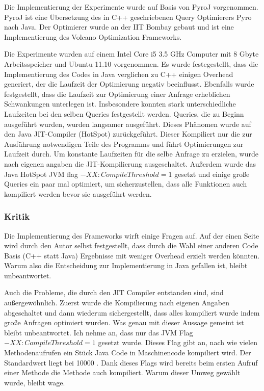 Die Implementierung der Experimente wurde auf Basis von PyroJ vorgenommen. PyroJ ist eine Übersetzung des in C++ geschriebenen Query Optimierers Pyro nach Java. Der Optimierer wurde an der IIT Bombay gebaut und ist eine Implementierung des Volcano Optimization Frameworks.

Die Experimente wurden auf einem Intel Core i5 3.5 GHz Computer mit 8 Gbyte Arbeitsspeicher und Ubuntu 11.10 vorgenommen. Es wurde festegestellt, dass die Implementierung des Codes in Java verglichen zu C++ einigen Overhead generiert, der die Laufzeit der Optimierung negativ beeinflusst. Ebenfalls wurde festgestellt, dass die Laufzeit zur Optimierung einer Anfrage erheblichen Schwankungen unterlegen ist. Insbesondere konnten stark unterschiedliche Laufzeiten bei den selben Queries festgestellt werden. Queries, die zu Beginn ausgeführt wurden, wurden langsamer ausgeführt. Dieses Phänomen wurde auf den Java JIT-Compiler (HotSpot) zurückgeführt. Dieser Kompiliert nur die zur Ausführung notwendigen Teile des Programms und führt Optimierungen zur Laufzeit durch. Um konstante Laufzeiten für die selbe Anfrage zu erzielen, wurde nach eigenen angaben die JIT-Kompilierung ausgeschaltet. Außerdem wurde das Java HotSpot JVM flag $-XX:CompileThreshold=1$ gesetzt und einige große Queries ein paar mal optimiert, um sicherzustellen, dass alle Funktionen auch kompiliert werden bevor sie ausgeführt werden.
 

\subsubsection{Kritik} 


Die Implementierung des Frameworks wirft einige Fragen auf. Auf der einen Seite wird durch den Autor selbst festgestellt, dass durch die Wahl einer anderen Code Basis (C++ statt Java) Ergebnisse mit weniger Overhead erzielt werden könnten. Warum also die Entscheidung zur Implementierung in Java gefallen ist, bleibt unbeantwortet.

Auch die Probleme, die durch den JIT Compiler entstanden sind, sind außergewöhnlich. Zuerst wurde die Kompilierung nach eigenen Angaben abgeschaltet und dann wiederum sichergestellt, dass alles kompiliert wurde indem große Anfragen optimiert wurden. Was genau mit dieser Aussage gemeint ist bleibt unbeantwortet.  Ich nehme an, dass nur das JVM Flag $-XX:CompileThreshold=1$ gesetzt wurde. Dieses Flag gibt an, nach wie vielen Methodenaufrufen ein Stück Java Code in Maschinencode kompiliert wird. Der Standardwert liegt bei 10000 \cite{oracle2015VMOptions}. Dank dieses Flags wird bereits beim ersten Aufruf einer Methode die Methode auch kompiliert. Warum dieser Umweg gewählt wurde, bleibt wage.

